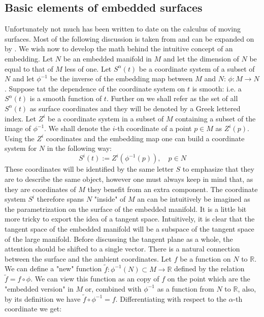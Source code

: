 \documentclass[../main.tex]{subfiles}
\begin{document}
    \subsection{Basic elements of embedded surfaces}
        Unfortunately not much has been written to date on the calculus of moving surfaces. Most of the following discussion is taken from and can be expanded on by \cite{grinfeld2016introduction}. We wish now to develop the math behind the intuitive concept of an embedding. Let $N$ be an embedded manifold in $M$ and let the dimension of $N$ be equal to that of $M$ less of one. Let $S^\alpha(t)$ be a coordinate system of a subset of $N$ and let $\phi^{-1}$ be the inverse of the embedding map between $M$ and $N$: $\phi:M\to N$. Suppose tat the dependence of the coordinate system on $t$ is smooth: i.e. a $S^\alpha(t)$ is a smooth function of $t$. Further on we shall refer as the set of all $S^\alpha(t)$ as surface coordinates and they will be denoted by a Greek lettered index. Let $Z^i$ be a coordinate system in a subset of $M$ containing a subset of the image of $\phi^{-1}$. We shall denote the $i$-th coordinate of a point $p\in M$ as $Z^i(p)$. Using the $Z^i$ coordinates and the embedding map one can build a coordinate system for $N$ in the following way:
        \begin{equation}
            S^i(t):=Z^i(\phi^{-1}(p)),\quad p\in N
        \end{equation}
        These coordinates will be identified by the same letter $S$ to emphasize that they are to describe the same object, however one must always keep in mind that, as they are coordinates of $M$ they benefit from an extra component. The coordinate system $S^i$ therefore spans $N$ "inside" of $M$ an can be intuitively be imagined as the parametrization on the surface of the embedded manifold. It is a little bit more tricky to export the idea of a tangent space. Intuitively, it is clear that the tangent space of the embedded manifold will be a subspace of the tangent space of the large manifold. Before discussing the tangent plane as a whole, the attention should be shifted to a single vector. There is a natural connection between the surface and the ambient coordinates. Let $f$ be a function on $N$ to $\mathbb{R}$. We can define a "new" function $\tilde{f}:\phi^{-1}(N)\subset M\to \mathbb{R} $ defined by the relation $\tilde{f}=f\circ\phi $. We can view this function as an copy of $f$ on the point which are the "embedded version" in $M$ or, combined with $\phi^{-1}$ as a function from $N$ to $\mathbb{R}$, also, by its definition we have $\tilde{f}\circ\phi^{-1}=f$. Differentiating with respect to the $\alpha$-th coordinate we get:
\end{document}
